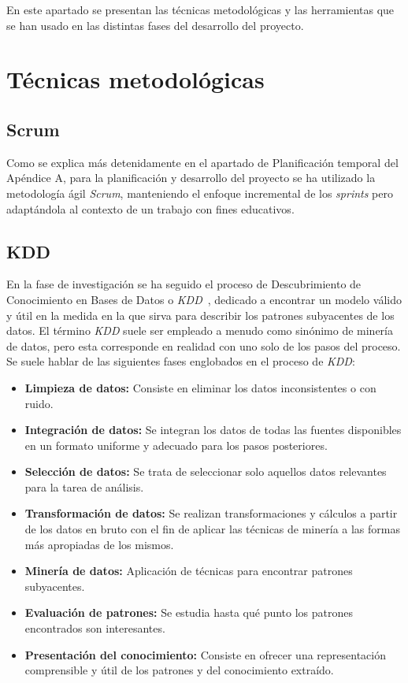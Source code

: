 \label{tecnicas y herramientas}

En este apartado se presentan las técnicas metodológicas y las herramientas que se han usado en las distintas fases del desarrollo del proyecto. 


\section{Técnicas metodológicas}

\subsection{Scrum}

Como se explica más detenidamente en el apartado de Planificación temporal del Apéndice A, para la planificación y desarrollo del proyecto se ha utilizado la metodología ágil \textit{Scrum}, manteniendo el enfoque incremental de los \textit{sprints} pero adaptándola al contexto de un trabajo con fines educativos. 

\subsection{KDD}

En la fase de investigación se ha seguido el proceso de Descubrimiento de Conocimiento en Bases de Datos o \textit{KDD}~\cite{fayyad1996data}, dedicado a encontrar un modelo válido y útil en la medida en la que sirva para describir los patrones subyacentes de los datos. El término \textit{KDD} suele ser empleado a menudo como sinónimo de minería de datos, pero esta corresponde en realidad con uno solo de los pasos del proceso. Se suele hablar de las siguientes fases englobados en el proceso de \textit{KDD}: 

\begin{itemize}
	\item \textbf{Limpieza de datos:} Consiste en eliminar los datos inconsistentes o con ruido.  
	\item \textbf{Integración de datos:} Se integran los datos de todas las fuentes disponibles en un formato uniforme y adecuado para los pasos posteriores. 
	\item \textbf{Selección de datos:} Se trata de seleccionar solo aquellos datos relevantes para la tarea de análisis.  
	\item \textbf{Transformación de datos:} Se realizan transformaciones y cálculos a partir de los datos en bruto con el fin de aplicar las técnicas de minería a las formas más apropiadas de los mismos. 
	\item \textbf{Minería de datos:} Aplicación de técnicas para encontrar patrones subyacentes. 
	\item \textbf{Evaluación de patrones:} Se estudia hasta qué punto los patrones encontrados son interesantes. 
	\item \textbf{Presentación del conocimiento:} Consiste en ofrecer una representación comprensible y útil de los patrones y del conocimiento extraído. 
\end{itemize}

